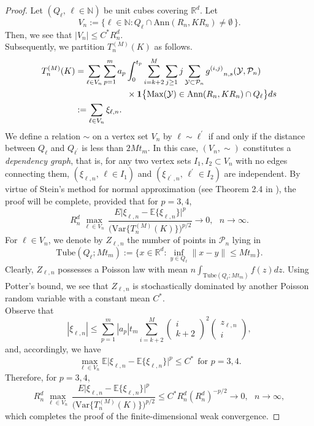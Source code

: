 \documentclass[11pt]{amsart}
\numberwithin{equation}{section}
\theoremstyle{plain}
\theoremstyle{definition}
\begin{document}
\begin{proof}
Let $(Q_\ell, \, \ell \in {{\mathbb N}})$ be unit cubes covering ${{\mathbb R}}^d$. Let
$$
V_n := \bigl\{ \ell \in {{\mathbb N}}: Q_\ell \cap \text{Ann}(R_n,KR_n) \neq \emptyset \, \bigr\}.
$$
Then, we see that $| V_n  | \leq C^* R_n^d$. \\
Subsequently, we partition $T_n^{(M)}(K)$ as follows.
\begin{align*}
T_n^{(M)}(K) &= \sum_{\ell \in V_n} \sum_{p=1}^m a_p \int_0^{t_p} \sum_{i=k+2}^M \sum_{j\geq1} j \sum_{{{\mathcal{Y}}} \subset {\mathcal P_n}} {g^{(i,j)}}_{n,s}({{\mathcal{Y}}}, {\mathcal P_n})\,\\
&\qquad \qquad \qquad \times  {{\bf 1}} \bigl\{ \text{Max}({{\mathcal{Y}}}) \in \text{Ann}(R_n,KR_n) \cap Q_\ell \bigr\}ds \\
&:= \sum_{\ell \in V_n} \xi_{\ell,n}.
\end{align*}
We define a relation $\sim$ on a vertex set $V_n$ by $\ell \sim {{\ell^{\prime}}}$ if and only if the distance between $Q_\ell$ and $Q_{{\ell^{\prime}}}$ is less than $2Mt_m$. In this case, $(V_n, \sim)$ constitutes a \textit{dependency graph}, that is, for any two vertex sets $I_1, I_2 \subset V_n$ with no edges connecting them, $(\xi_{\ell, n}, \, \ell \in I_1)$ and $(\xi_{{{\ell^{\prime}}}, n}, \, {{\ell^{\prime}}} \in I_2)$ are independent.
By virtue of Stein's method for normal approximation (see Theorem 2.4 in \cite{penrose:2003}), the proof will be complete, provided that for $p=3,4$,
$$
R_n^d\, \max_{\ell \in V_n}\, \frac{E \bigl| \xi_{\ell,n} - {\mathbb{E}}\{ \xi_{\ell,n} \} \bigr|^p}{\bigl( \text{Var}\{ T_n^{(M)}(K) \} \bigr)^{p/2}} \to 0, \ \ \ n\to \infty.
$$
For $\ell \in V_n$, we denote by $Z_{\ell,n}$ the number of points in ${\mathcal P_n}$ lying in
$$
\text{Tube}(Q_\ell; Mt_m) := \bigl\{ x\in{{\mathbb R}}^d: \inf_{y \in Q_\ell}\|x-y \| \leq Mt_m \bigr\}.
$$
Clearly, $Z_{\ell,n}$ possesses a Poisson law with mean $n\int_{\text{Tube}(Q_\ell; Mt_m)}f(z)dz$. Using Potter's bound, we see that $Z_{\ell,n}$ is stochastically dominated by another Poisson random variable with a constant mean $C^*$. \\
Observe that
$$
|\xi_{\ell,n} |\leq \sum_{p=1}^m |a_p| t_m \sum_{i=k+2}^M \begin{pmatrix} i \\ k+2 \end{pmatrix}^2 \begin{pmatrix} z_{\ell,n} \\ i \end{pmatrix},
$$
and, accordingly, we have
$$
\max_{\ell \in V_n} {\mathbb{E}} \bigl| \xi_{\ell,n} - {\mathbb{E}} \{ \xi_{\ell,n} \} \bigr|^p \leq C^* \ \ \text{for } p=3,4.
$$
Therefore, for $p=3,4$,
$$
R_n^d\, \max_{\ell \in V_n}\, \frac{E \bigl| \xi_{\ell,n} - {\mathbb{E}}\{ \xi_{\ell,n} \} \bigr|^p}{\bigl( \text{Var}\{ T_n^{(M)}(K) \} \bigr)^{p/2}} \leq C^* R_n^d (R_n^d)^{-p/2} \to 0, \ \ \ n\to\infty,
$$
which completes the proof of the finite-dimensional weak convergence.


\end{proof}
\end{document}
